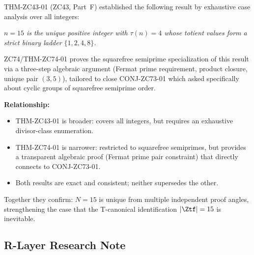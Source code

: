 \documentclass[12pt, a4paper]{article}
\begin{document}
\begin{keybox}[title={Comparison with THM-ZC43-01 (Part~F)}]
THM-ZC43-01 (ZC43, Part~F) established the following result
by exhaustive case analysis over all integers:
\begin{center}
\textit{$n = 15$ is the unique positive integer with $\tau(n) = 4$
whose totient values form a strict binary ladder $\{1, 2, 4, 8\}$.}
\end{center}

ZC74/THM-ZC74-01 proves the squarefree semiprime specialization
of this result via a three-step algebraic argument (Fermat prime
requirement, product closure, unique pair $(3,5)$), tailored to
close CONJ-ZC73-01 which asked specifically about cyclic groups
of squarefree semiprime order.

\medskip
\textbf{Relationship:}
\begin{itemize}[leftmargin=2em, noitemsep]
  \item THM-ZC43-01 is broader: covers all integers, but requires
    an exhaustive divisor-class enumeration.
  \item THM-ZC74-01 is narrower: restricted to squarefree semiprimes,
    but provides a transparent algebraic proof (Fermat prime pair
    constraint) that directly connects to CONJ-ZC73-01.
  \item Both results are exact and consistent; neither supersedes
    the other.
\end{itemize}

\medskip
Together they confirm: $N = 15$ is unique from multiple
independent proof angles, strengthening the case that the
T-canonical identification $|\Ztf| = 15$ is inevitable.
\end{keybox}

\subsection{R-Layer Research Note}
\label{sec:rlayer}
\end{document}
